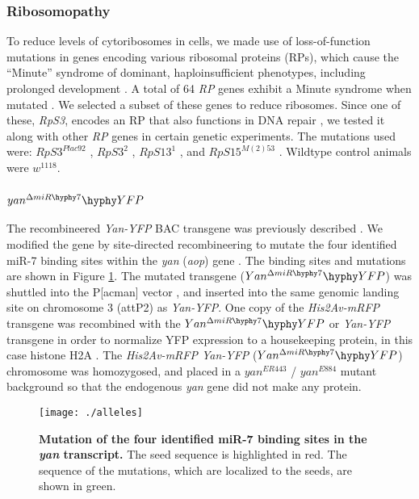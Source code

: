 \subsubsection{Ribosomopathy}
\label{appendix:supp:metabolism:exp:ribosomopathy}

To reduce levels of cytoribosomes in cells, we made use of loss-of-function mutations in genes encoding various ribosomal proteins (RPs), which cause the ``Minute'' syndrome of dominant, haploinsufficient phenotypes, including prolonged development \cite{Sæbøelarssen1998}. A total of 64 \textit{RP} genes exhibit a Minute syndrome when mutated \cite{Marygold2007}. We selected a subset of these genes to reduce ribosomes. Since one of these, \textit{RpS3}, encodes an RP that also functions in DNA repair \cite{Graifer2014}, we tested it along with other \textit{RP} genes in certain genetic experiments. The mutations used were: $RpS3^{Plac92}$ \cite{Sæbøelarssen1998}, $RpS3^{2}$ \cite{Ferrus1975}, $RpS13^{1}$ \cite{Sæbøelarssen1998}, and $RpS15^{M(2)53}$ \cite{Golic1996}. Wildtype control animals were $w^{1118}$.

\subsubsection{$yan^{\Delta miR\hyphy 7}\hyphy YFP$}
\label{appendix:supp:metabolism:exp:yan_delta}

The recombineered \textit{Yan-YFP} BAC transgene was previously described \cite{Webber2013}. We modified the gene by site-directed recombineering to mutate the four identified miR-7 binding sites within the \textit{yan} (\textit{aop}) gene \cite{Li2005}. The binding sites and mutations are shown in Figure \ref{fig:metabolism:methods:alleles}. The mutated transgene ($Yan^{\Delta miR\hyphy 7}\hyphy YFP$) was shuttled into the P{[}acman{]} vector \cite{Venken2006}, and inserted into the same genomic landing site on chromosome 3 (attP2) as \textit{Yan-YFP}. One copy of the \textit{His2Av-mRFP} transgene was recombined with the $Yan^{\Delta miR\hyphy 7}\hyphy YFP$ or \textit{Yan-YFP} transgene in order to normalize YFP expression to a housekeeping protein, in this case histone H2A \cite{Pelaez2015a}. The \textit{His2Av-mRFP Yan-YFP} ($Yan^{\Delta miR\hyphy 7}\hyphy YFP$) chromosome was homozygosed, and placed in a $yan^{ER443}$ / $yan^{E884}$ mutant background so that the endogenous \textit{yan} gene did not make any protein.

\begin{figure}[h!]
\centering
\captionsetup{width=.65\linewidth}
\texttt{[image: ./alleles]}
\caption[Mutation of the four identified miR-7 binding sites in the \textit{yan} transcript.]{\textbf{Mutation of the four identified miR-7 binding sites in the \textit{yan} transcript.} The seed sequence is highlighted in red. The sequence of the mutations, which are localized to the seeds, are shown in green.}
\label{fig:metabolism:methods:alleles}
\end{figure}

